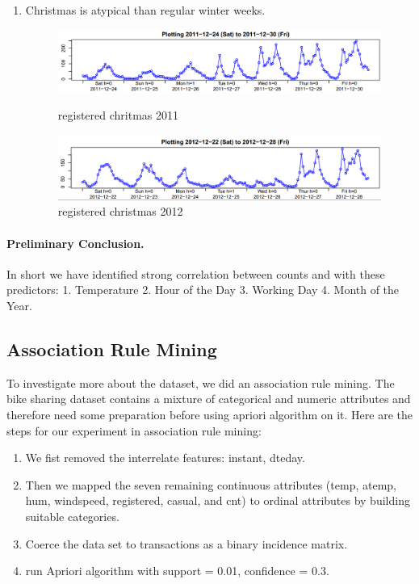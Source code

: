 \documentclass[12pt]{article}
\begin{document}
\begin{enumerate}
		\item Christmas is atypical than regular winter weeks.
			 \begin{figure}[H]
			 	\centering
			 	\begin{minipage}{.5\textwidth}
			 		\centering
			 		\includegraphics[width=\linewidth]{figures/registered_christmas_2011.png}
			 		\caption{registered chritmas 2011}
			 	\end{minipage}%
			 	\begin{minipage}{.5\textwidth}
			 		\centering
			 		\includegraphics[width=\linewidth]{figures/registered_christmas_2012.png}
			 		\caption{registered christmas 2012}
			 	\end{minipage}
			 \end{figure}
		\end{enumerate}
		
	\paragraph*{Preliminary Conclusion.}In short we have identified strong correlation between counts and with these predictors: 1. Temperature 2. Hour of the Day 3. Working Day 4. Month of the Year. 
	
	\subsection{Association Rule Mining}	
	To investigate more about the dataset, we did an association rule mining. The bike sharing dataset contains a mixture of categorical and numeric attributes and therefore need some preparation before using apriori algorithm on it. Here are the steps for our experiment in association rule mining:
    \begin{enumerate}
    	\item We fist removed the interrelate features: instant, dteday.
    	\item Then we mapped the seven remaining continuous attributes (temp, atemp, hum, windspeed, registered, casual, and cnt) to ordinal attributes by building suitable categories.
    	\item Coerce the data set to transactions as a binary incidence matrix.
    	\item run Apriori algorithm with support = 0.01, confidence = 0.3.
    \end{enumerate}
	
\end{document}
